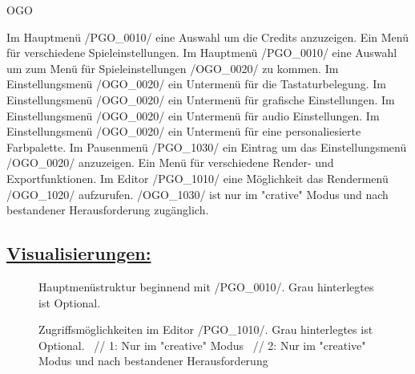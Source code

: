 \begin{ids}{\gls{OGO}}

	\id[0010] Im Hauptmenü /PGO\_0010/ eine Auswahl um die Credits anzuzeigen.
	\id[0020] Ein Menü für verschiedene Spieleinstellungen.
	\id[0030] Im Hauptmenü /PGO\_0010/ eine Auswahl um zum Menü für Spieleinstellungen /OGO\_0020/ zu kommen.
	\id[0040] Im Einstellungsmenü /OGO\_0020/ ein Untermenü für die Tastaturbelegung.
	\id[0050] Im Einstellungsmenü /OGO\_0020/ ein Untermenü für grafische Einstellungen.
	\id[0060] Im Einstellungsmenü /OGO\_0020/ ein Untermenü für audio Einstellungen.
	\id[0070] Im Einstellungsmenü /OGO\_0020/ ein Untermenü für eine personaliesierte Farbpalette.
	\id[1010] Im Pausenmenü /PGO\_1030/ ein Eintrag um das Einstellungsmenü /OGO\_0020/ anzuzeigen.
	\id[1020] Ein Menü für verschiedene Render- und Exportfunktionen.
	\id[1030] Im Editor /PGO\_1010/ eine Möglichkeit das Rendermenü /OGO\_1020/ aufzurufen.
	\id[1040] /OGO\_1030/ ist nur im "crative" Modus und nach bestandener Herausforderung zugänglich.
\end{ids}



%
%
%
\clearpage

\subsection*{\underline{Visualisierungen:}}

\begin{landscape}

	\begin{figure}[h]
		\centering
	 	
	 	\caption{Hauptmenüstruktur beginnend mit /PGO\_0010/. Grau hinterlegtes ist Optional.}
	\end{figure}
	
\end{landscape}

\clearpage

\begin{landscape}

	\begin{figure}[h]
		\centering
	 	
	 	\caption{Zugriffsmöglichkeiten im Editor /PGO\_1010/. Grau hinterlegtes ist Optional. ~//
			1: Nur im "creative" Modus ~//
			2: Nur im "creative" Modus und nach bestandener Herausforderung}
	\end{figure}
	
\end{landscape}
	
